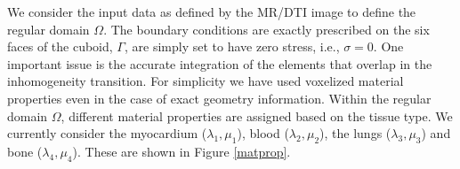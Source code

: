 We consider the input data as defined by the MR/DTI image to define the regular domain $\Omega$. The boundary conditions are exactly prescribed on the six faces of the cuboid, $\Gamma$, are simply set to have zero stress, i.e., $\sigma = 0$. One important issue is the accurate integration of the elements that overlap in the inhomogeneity transition. For simplicity we have used voxelized material	properties even in the case of exact geometry information. Within the regular domain $\Omega$, different material properties are assigned based on the tissue type. We currently consider the myocardium ($\lambda_1, \mu_1$), blood ($\lambda_2, \mu_2$), the lungs ($\lambda_3, \mu_3$) and bone ($\lambda_4, \mu_4$). These are shown in Figure \ref{matprop}.



